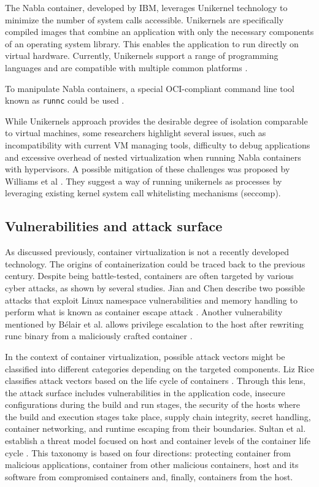 The Nabla container, developed by IBM, leverages Unikernel technology to minimize the number of system calls accessible. Unikernels are specifically compiled images that combine an application with only the necessary components of an operating system library. This enables the application to run directly on virtual hardware. Currently, Unikernels support a range of programming languages and are compatible with multiple common platforms \cite{acm:4}.

To manipulate Nabla containers, a special OCI-compliant command line tool known as \texttt{runnc} could be used \cite{gh:runnc}.

While Unikernels approach provides the desirable degree of isolation comparable to virtual machines, some researchers highlight several issues, such as incompatibility with current VM managing tools, difficulty to debug applications and excessive overhead of nested virtualization when running Nabla containers with hypervisors. A possible mitigation of these challenges was proposed by Williams et al \cite{acm:4}. They suggest a way of running unikernels as processes by leveraging existing kernel system call whitelisting mechanisms (seccomp).


\subsection{Vulnerabilities and attack surface}

As discussed previously, container virtualization is not a recently developed technology. The origins of containerization could be traced back to the previous century. Despite being battle-tested, containers are often targeted by various cyber attacks, as shown by several studies. Jian and Chen describe two possible attacks that exploit Linux namespace vulnerabilities and memory handling to perform what is known as container escape attack \cite{acm:5}. Another vulnerability mentioned by Bélair et al. allows privilege escalation to the host after rewriting runc binary from a maliciously crafted container \cite{acm:6}.

In the context of container virtualization, possible attack vectors might be classified into different categories depending on the targeted components. Liz Rice classifies attack vectors based on the life cycle of containers \cite{book:rice}. Through this lens, the attack surface includes vulnerabilities in the application code, insecure configurations during the build and run stages, the security of the hosts where the build and execution stages take place, supply chain integrity, secret handling, container networking, and runtime escaping from their boundaries. Sultan et al. establish a threat model focused on host and container levels of the container life cycle \cite{ieee:1}. This taxonomy is based on four directions: protecting container from malicious applications, container from other malicious containers, host and its software from compromised containers and, finally, containers from the host.

